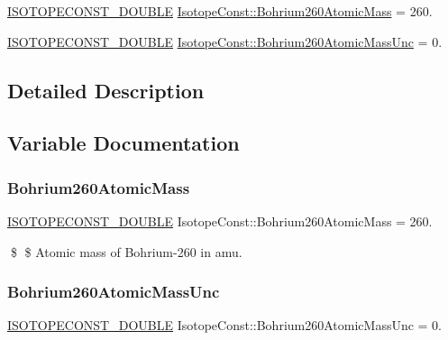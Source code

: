 \begin{DoxyCompactItemize}
\item 
\mbox{\hyperlink{group___isotope_const-_macros_ga8f45a7272ce02c0b4c65c44636ed719a}{I\+S\+O\+T\+O\+P\+E\+C\+O\+N\+S\+T\+\_\+\+D\+O\+U\+B\+LE}} \mbox{\hyperlink{group___isotope_const-_bohrium-_bh260_ga8af56345300fefd6c59653c2918d5dcc}{Isotope\+Const\+::\+Bohrium260\+Atomic\+Mass}} = 260.
\item 
\mbox{\hyperlink{group___isotope_const-_macros_ga8f45a7272ce02c0b4c65c44636ed719a}{I\+S\+O\+T\+O\+P\+E\+C\+O\+N\+S\+T\+\_\+\+D\+O\+U\+B\+LE}} \mbox{\hyperlink{group___isotope_const-_bohrium-_bh260_ga318f9404d7f2174d7b1508a3b39540ec}{Isotope\+Const\+::\+Bohrium260\+Atomic\+Mass\+Unc}} = 0.
\end{DoxyCompactItemize}


\subsection{Detailed Description}


\subsection{Variable Documentation}
\mbox{\label{group___isotope_const-_bohrium-_bh260_ga8af56345300fefd6c59653c2918d5dcc}} 
\subsubsection{\texorpdfstring{Bohrium260\+Atomic\+Mass}{Bohrium260AtomicMass}}
{\footnotesize\ttfamily \mbox{\hyperlink{group___isotope_const-_macros_ga8f45a7272ce02c0b4c65c44636ed719a}{I\+S\+O\+T\+O\+P\+E\+C\+O\+N\+S\+T\+\_\+\+D\+O\+U\+B\+LE}} Isotope\+Const\+::\+Bohrium260\+Atomic\+Mass = 260.}

\$ \$ Atomic mass of Bohrium-\/260 in amu. \mbox{\label{group___isotope_const-_bohrium-_bh260_ga318f9404d7f2174d7b1508a3b39540ec}} 
\subsubsection{\texorpdfstring{Bohrium260\+Atomic\+Mass\+Unc}{Bohrium260AtomicMassUnc}}
{\footnotesize\ttfamily \mbox{\hyperlink{group___isotope_const-_macros_ga8f45a7272ce02c0b4c65c44636ed719a}{I\+S\+O\+T\+O\+P\+E\+C\+O\+N\+S\+T\+\_\+\+D\+O\+U\+B\+LE}} Isotope\+Const\+::\+Bohrium260\+Atomic\+Mass\+Unc = 0.}

